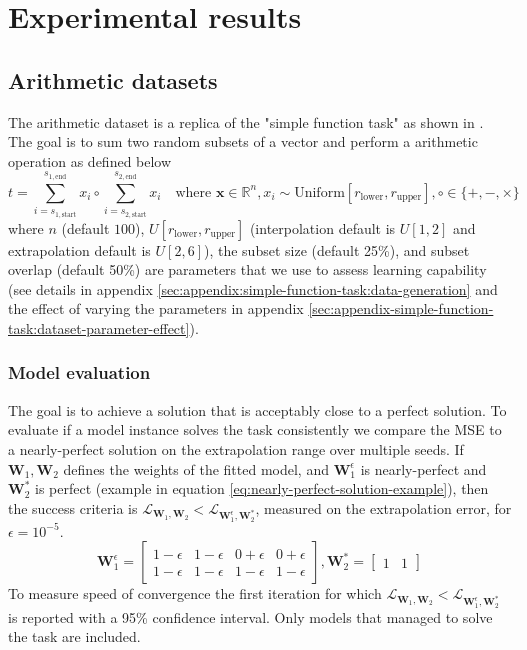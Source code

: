 \section{Experimental results}
\label{sec:experiments}

\subsection{Arithmetic datasets}
\label{sec:arithmetic-dataset}

The arithmetic dataset is a replica of the "simple function task" as shown in \citet{trask-nalu}.
The goal is to sum two random subsets of a vector and perform a arithmetic operation as defined below
\begin{equation}
t = \sum_{i = s_{1,\mathrm{start}}}^{s_{1,\mathrm{end}}} x_i \circ \sum_{i = s_{2,\mathrm{start}}}^{s_{2,\mathrm{end}}} x_i \quad \text{where } \mathbf{x} \in \mathbb{R}^n, x_i \sim \mathrm{Uniform}[r_{\mathrm{lower}}, r_{\mathrm{upper}}], \circ \in \{+, -, \times\}
\label{eq:arithmetic-problem}
\end{equation}
where $n$ (default $100$), $U[r_{\mathrm{lower}}, r_{\mathrm{upper}}]$ (interpolation default is $U[1,2]$ and extrapolation default is $U[2,6]$), the subset size (default 25\%), and subset overlap (default 50\%) are parameters that we use to assess learning capability (see details in appendix \ref{sec:appendix:simple-function-task:data-generation} and the effect of varying the parameters in appendix \ref{sec:appendix-simple-function-task:dataset-parameter-effect}).

\subsubsection{Model evaluation}
The goal is to achieve a solution that is acceptably close to a perfect solution. To evaluate if a model instance solves the task consistently we compare the MSE to a nearly-perfect solution on the extrapolation range over multiple seeds. If $\mathbf{W}_1, \mathbf{W}_2$ defines the weights of the fitted model, and $\mathbf{W}_1^\epsilon$ is nearly-perfect and $\mathbf{W}_2^*$ is perfect (example in equation \ref{eq:nearly-perfect-solution-example}), then the success criteria is $\mathcal{L}_{\mathbf{W}_1, \mathbf{W}_2} < \mathcal{L}_{\mathbf{W}_1^\epsilon, \mathbf{W}_2^*}$, measured on the extrapolation error, for $\epsilon = 10^{-5}$.
\begin{equation}
    \mathbf{W}_1^\epsilon = \begin{bmatrix}
    1 - \epsilon & 1 - \epsilon & 0 + \epsilon & 0 + \epsilon \\
    1 - \epsilon & 1 - \epsilon & 1 - \epsilon & 1 - \epsilon
    \end{bmatrix}, \mathbf{W}_2^* = \begin{bmatrix}
    1 & 1
    \end{bmatrix}
    \label{eq:nearly-perfect-solution-example}
\end{equation}
To measure speed of convergence the first iteration for which $\mathcal{L}_{\mathbf{W}_1, \mathbf{W}_2} < \mathcal{L}_{\mathbf{W}_1^\epsilon, \mathbf{W}_2^*}$ is reported with a 95\% confidence interval. Only models that managed to solve the task are included.

